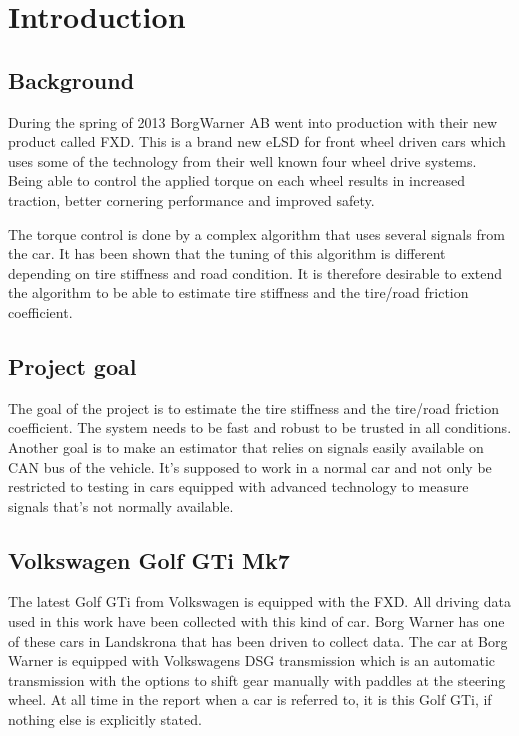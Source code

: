 \chapter{Introduction}

\section{Background}
During the spring of 2013 BorgWarner AB went into production with their new product called FXD. This is a brand new eLSD for front wheel driven cars which uses some of the technology from their well known four wheel drive systems. Being able to control the applied torque on each wheel results in increased traction, better cornering performance and improved safety.

The torque control is done by a complex algorithm that uses several signals from the car. It has been shown that the tuning of this algorithm is different depending on tire stiffness and road condition. It is therefore desirable to extend the algorithm to be able to estimate tire stiffness and the tire/road friction coefficient.

\section{Project goal}
The goal of the project is to estimate the tire stiffness and the tire/road friction coefficient. The system needs to be fast and robust to be trusted in all conditions. Another goal is to make an estimator that relies on signals easily available on CAN bus of the vehicle. It's supposed to work in a normal car and not only be restricted to testing in cars equipped with advanced technology to measure signals that's not normally available. 

\section{Volkswagen Golf GTi Mk7}
The latest Golf GTi from Volkswagen is equipped with the FXD. All driving data used in this work have been collected with this kind of car. Borg Warner has one of these cars in Landskrona that has been driven to collect data. The car at Borg Warner is equipped with Volkswagens DSG transmission which is an automatic transmission with the options to shift gear manually with paddles at the steering wheel. At all time in the report when a car is referred to, it is this Golf GTi, if nothing else is explicitly stated.